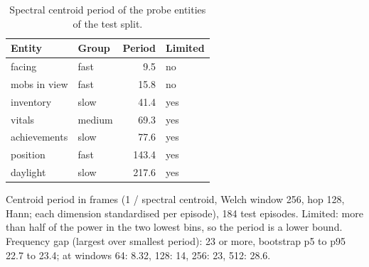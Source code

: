 \begin{table}[H]
\centering
\caption{Spectral centroid period of the probe entities of the test split.}
\label{tab:data-spectral}
\small
\setlength{\tabcolsep}{3.5pt}
\begin{tabular}{llrl}
\toprule
Entity & Group & Period & Limited \\
\midrule
facing & fast & 9.5 & no \\
mobs in view & fast & 15.8 & no \\
inventory & slow & 41.4 & yes \\
vitals & medium & 69.3 & yes \\
achievements & slow & 77.6 & yes \\
position & fast & 143.4 & yes \\
daylight & slow & 217.6 & yes \\
\bottomrule
\end{tabular}

\vspace{4pt}
\begin{minipage}{\linewidth}
\footnotesize\raggedright Centroid period in frames (1 / spectral centroid, Welch window 256, hop 128, Hann; each dimension standardised per episode), 184 test episodes. Limited: more than half of the power in the two lowest bins, so the period is a lower bound. Frequency gap (largest over smallest period): 23 or more, bootstrap p5 to p95 22.7 to 23.4; at windows 64: 8.32, 128: 14, 256: 23, 512: 28.6.
\end{minipage}
\end{table}
